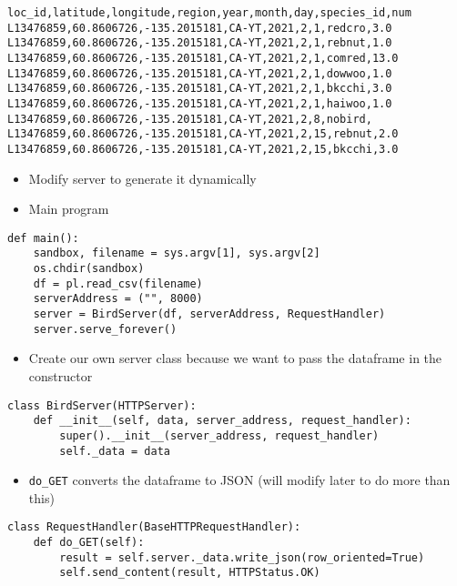 \documentclass[krantzl]{krantz}
\begin{document}
\begin{lstlisting}[frame=tblr,backgroundcolor=\color{black!5}]
loc_id,latitude,longitude,region,year,month,day,species_id,num
L13476859,60.8606726,-135.2015181,CA-YT,2021,2,1,redcro,3.0
L13476859,60.8606726,-135.2015181,CA-YT,2021,2,1,rebnut,1.0
L13476859,60.8606726,-135.2015181,CA-YT,2021,2,1,comred,13.0
L13476859,60.8606726,-135.2015181,CA-YT,2021,2,1,dowwoo,1.0
L13476859,60.8606726,-135.2015181,CA-YT,2021,2,1,bkcchi,3.0
L13476859,60.8606726,-135.2015181,CA-YT,2021,2,1,haiwoo,1.0
L13476859,60.8606726,-135.2015181,CA-YT,2021,2,8,nobird,
L13476859,60.8606726,-135.2015181,CA-YT,2021,2,15,rebnut,2.0
L13476859,60.8606726,-135.2015181,CA-YT,2021,2,15,bkcchi,3.0
\end{lstlisting}

\begin{itemize}
\item Modify server to generate it dynamically

\item Main program

\end{itemize}
\begin{lstlisting}[frame=tblr]
def main():
    sandbox, filename = sys.argv[1], sys.argv[2]
    os.chdir(sandbox)
    df = pl.read_csv(filename)
    serverAddress = ("", 8000)
    server = BirdServer(df, serverAddress, RequestHandler)
    server.serve_forever()
\end{lstlisting}

\begin{itemize}
\item Create our own server class because we want to pass the dataframe in the constructor

\end{itemize}
\begin{lstlisting}[frame=tblr]
class BirdServer(HTTPServer):
    def __init__(self, data, server_address, request_handler):
        super().__init__(server_address, request_handler)
        self._data = data
\end{lstlisting}

\begin{itemize}
\item \texttt{do\_GET} converts the dataframe to JSON (will modify later to do more than this)

\end{itemize}
\begin{lstlisting}[frame=tblr]
class RequestHandler(BaseHTTPRequestHandler):
    def do_GET(self):
        result = self.server._data.write_json(row_oriented=True)
        self.send_content(result, HTTPStatus.OK)
\end{lstlisting}
\end{document}
